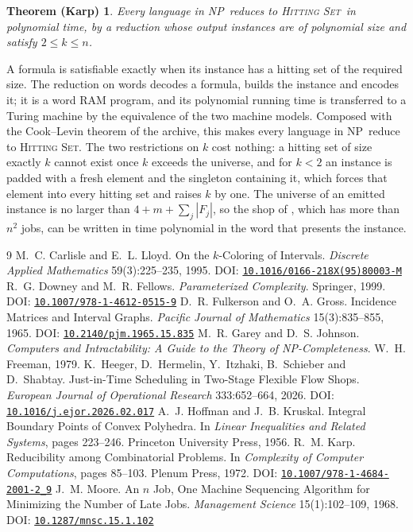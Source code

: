 \documentclass[11pt,a4paper]{article}
\theoremstyle{definition}
\theoremstyle{plain}
\newtheorem*{karp}{Theorem (Karp)}
\newcommand{\doi}[1]{DOI: \href{https://doi.org/#1}{\nolinkurl{#1}}}
\newcommand{\HS}{\textsc{Hitting Set}}
\newcommand{\NP}{\textnormal{\textsf{NP}}}
\begin{document}
\begin{karp}\label{thm:hs}
Every language in \NP\ reduces to \HS\ in polynomial time, by a reduction whose output
instances are of polynomial size and satisfy $2\le k\le n$.
\end{karp}
A formula is satisfiable exactly when its instance has a hitting set of the required size.
The reduction on words decodes a formula, builds the instance and encodes it; it is a word RAM
program, and
its polynomial running time is transferred to a Turing machine by the equivalence of the two
machine models.
Composed with the Cook--Levin theorem of the archive, this makes every language in \NP\ reduce to
\HS.
The two restrictions on $k$ cost nothing: a hitting set of size exactly $k$ cannot exist once
$k$ exceeds the universe, and for $k<2$ an instance is padded with a fresh element and the
singleton containing it, which forces that element into every hitting set and raises $k$ by one.
The universe of an emitted instance is no larger than $4+m+\sum_j|F_j|$, so the shop of
, which has more than $n^2$ jobs, can be written in time polynomial in the
word that presents the instance.

\begin{thebibliography}{9}
M.~C. Carlisle and E.~L. Lloyd.
\newblock On the $k$-Coloring of Intervals.
\newblock \emph{Discrete Applied Mathematics} 59(3):225--235, 1995.
\newblock \doi{10.1016/0166-218X(95)80003-M}
R.~G. Downey and M.~R. Fellows.
\newblock \emph{Parameterized Complexity}.
\newblock Springer, 1999.
\newblock \doi{10.1007/978-1-4612-0515-9}
D.~R. Fulkerson and O.~A. Gross.
\newblock Incidence Matrices and Interval Graphs.
\newblock \emph{Pacific Journal of Mathematics} 15(3):835--855, 1965.
\newblock \doi{10.2140/pjm.1965.15.835}
M.~R. Garey and D.~S. Johnson.
\newblock \emph{Computers and Intractability: A Guide to the Theory of NP-Completeness}.
\newblock W.~H. Freeman, 1979.
K.~Heeger, D.~Hermelin, Y.~Itzhaki, B.~Schieber and D.~Shabtay.
\newblock Just-in-Time Scheduling in Two-Stage Flexible Flow Shops.
\newblock \emph{European Journal of Operational Research} 333:652--664, 2026.
\newblock \doi{10.1016/j.ejor.2026.02.017}
A.~J. Hoffman and J.~B. Kruskal.
\newblock Integral Boundary Points of Convex Polyhedra.
\newblock In \emph{Linear Inequalities and Related Systems}, pages 223--246. Princeton University Press, 1956.
R.~M. Karp.
\newblock Reducibility among Combinatorial Problems.
\newblock In \emph{Complexity of Computer Computations}, pages 85--103. Plenum Press, 1972.
\newblock \doi{10.1007/978-1-4684-2001-2_9}
J.~M. Moore.
\newblock An $n$ Job, One Machine Sequencing Algorithm for Minimizing the Number of Late Jobs.
\newblock \emph{Management Science} 15(1):102--109, 1968.
\newblock \doi{10.1287/mnsc.15.1.102}
\end{thebibliography}
\end{document}
